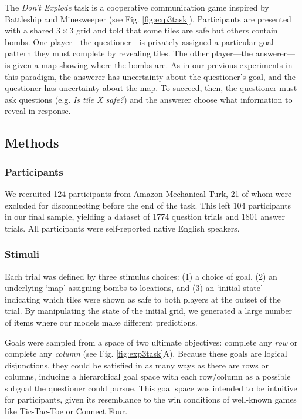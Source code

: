 \documentclass[11pt, floatsintext]{apa6}
\begin{document}
The \emph{Don't Explode} task is a cooperative communication game inspired by Battleship and Minesweeper (see Fig. \ref{fig:exp3task}). 
Participants are presented with a shared $3 \times 3$ grid and told that some tiles are safe but others contain bombs.
One player---the questioner---is privately assigned a particular goal pattern they must complete by revealing tiles.
The other player---the answerer---is given a map showing where the bombs are.
As in our previous experiments in this paradigm, the answerer has uncertainty about the questioner's goal, and the questioner has uncertainty about the map.
To succeed, then, the questioner must ask questions (e.g. \emph{Is tile X safe?}) and the answerer choose what information to reveal in response.

\subsection{Methods}

\subsubsection{Participants}

We recruited 124 participants from Amazon Mechanical Turk, 21 of whom were excluded for disconnecting before the end of the task. 
This left 104 participants in our final sample, yielding a dataset of 1774 question trials and 1801 answer trials. 
All participants were self-reported native English speakers.

\subsubsection{Stimuli}

Each trial was defined by three stimulus choices: (1) a choice of goal, (2) an underlying `map' assigning bombs to locations, and (3) an `initial state' indicating which tiles were shown as safe to both players at the outset of the trial.
By manipulating the state of the initial grid, we generated a large number of items where our models make different predictions. 

Goals were sampled from a space of two ultimate objectives: complete any \emph{row} or complete any \emph{column} (see Fig. \ref{fig:exp3task}A).
Because these goals are logical disjunctions, they could be satisfied in as many ways as there are rows or columns, inducing a hierarchical goal space with each row/column as a possible subgoal the questioner could pursue.
This goal space was intended to be intuitive for participants, given its resemblance to the win conditions of well-known games like Tic-Tac-Toe or Connect Four.
\end{document}
